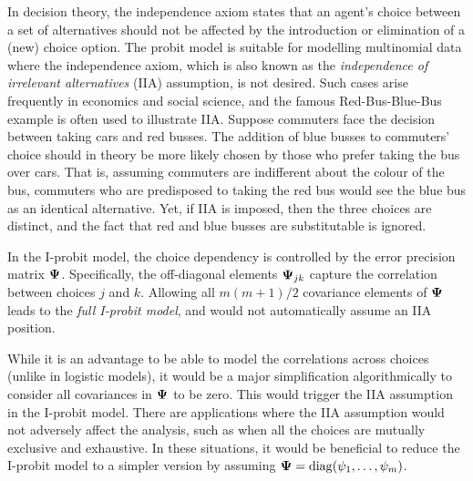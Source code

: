 In decision theory, the independence axiom states that an agent's choice between a set of alternatives should not be affected by the introduction or elimination of a (new) choice option.
The probit model is suitable for modelling multinomial data where the independence axiom, which is also known as the \emph{independence of irrelevant alternatives} (IIA) assumption, is not desired. 
Such cases arise frequently in economics and social science, and the famous Red-Bus-Blue-Bus example is often used to illustrate IIA.
Suppose commuters face the decision between taking cars and red busses. 
The addition of blue busses to commuters' choice should in theory be more likely chosen by those who prefer taking the bus over cars.
That is, assuming commuters are indifferent about the colour of the bus, commuters who are predisposed to taking the red bus would see the blue bus as an identical alternative.
 Yet, if IIA is imposed, then the three choices are distinct, and the fact that red and blue busses are substitutable is ignored.

In the I-probit model, the choice dependency is controlled by the error precision matrix ${\bm\Psi}$.
Specifically, the off-diagonal elements ${\bm\Psi}_{jk}$ capture the correlation between choices $j$ and $k$.
Allowing all $m(m+1)/2$ covariance elements of ${\bm\Psi}$ leads to the \emph{full I-probit model}, and would not automatically assume an IIA position.


While it is an advantage to be able to model the correlations across choices (unlike in logistic models), it would be a major simplification algorithmically to consider all covariances in ${\bm\Psi}$ to be zero.
This would trigger the IIA assumption in the I-probit model.
There are applications where the IIA assumption would not adversely affect the analysis, such as when all the choices are mutually exclusive and exhaustive.
In these situations, it would be beneficial to reduce the I-probit model to a simpler version by assuming ${\bm\Psi} = \operatorname{diag}(\psi_1,\dots,\psi_m)$.

